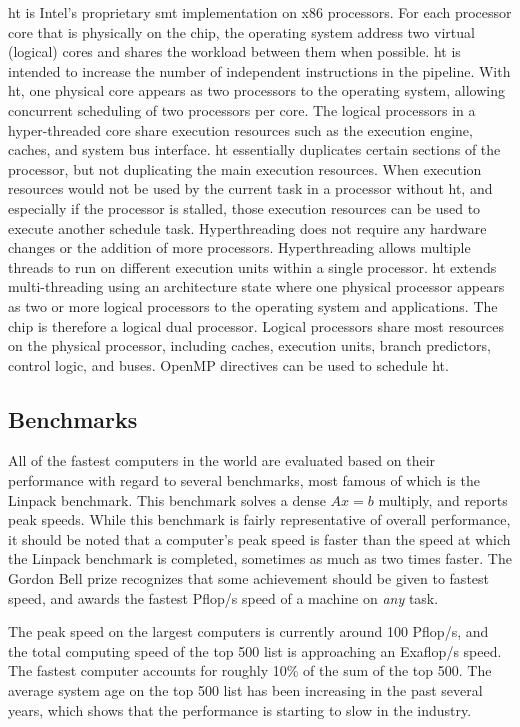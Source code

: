 \documentclass[10pt]{article}
\begin{document}
\begin{flushleft}
\gls{ht} is Intel's proprietary \gls{smt} implementation on x86 processors. For each processor core that is physically on the chip, the operating system address two virtual (logical) cores and shares the workload between them when possible. \gls{ht} is intended to increase the number of independent instructions in the pipeline. With \gls{ht}, one physical core appears as two processors to the operating system, allowing concurrent scheduling of two processors per core. The logical processors in a hyper-threaded core share execution resources such as the execution engine, caches, and system bus interface. \gls{ht} essentially duplicates certain sections of the processor, but not duplicating the main execution resources. When execution resources would not be used by the current task in a processor without \gls{ht}, and especially if the processor is stalled, those execution resources can be used to execute another schedule task. Hyperthreading does not require any hardware changes or the addition of more processors. Hyperthreading allows multiple threads to run on different execution units within a single processor. \gls{ht} extends multi-threading using an architecture state where one physical processor appears as two or more logical processors to the operating system and applications. The chip is therefore a logical dual processor. Logical processors share most resources on the physical processor, including caches, execution units, branch predictors, control logic, and buses. OpenMP directives can be used to schedule \gls{ht}. 

\subsection{Benchmarks}

All of the fastest computers in the world are evaluated based on their performance with regard to several benchmarks, most famous of which is the Linpack benchmark. This benchmark solves a dense \(Ax=b\) multiply, and reports peak speeds. While this benchmark is fairly representative of overall performance, it should be noted that a computer's peak speed is faster than the speed at which the Linpack benchmark is completed, sometimes as much as two times faster. The Gordon Bell prize recognizes that some achievement should be given to fastest speed, and awards the fastest Pflop/s speed of a machine on \textit{any} task.

The peak speed on the largest computers is currently around 100 Pflop/s, and the total computing speed of the top 500 list is approaching an Exaflop/s speed. The fastest computer accounts for roughly 10\% of the sum of the top 500. The average system age on the top 500 list has been increasing in the past several years, which shows that the performance is starting to slow in the industry.


\end{flushleft}
\end{document}
